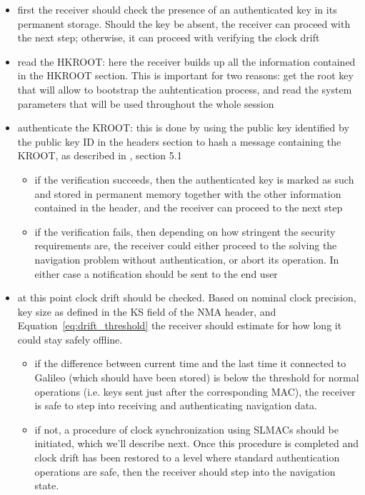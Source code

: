 \begin{itemize}
  \item first the receiver should check the presence of an authenticated key in
    its permanent storage. Should the key be absent, the receiver can proceed
    with the next step; otherwise, it can proceed with verifying the clock drift
  \item read the HKROOT: here the receiver builds up all the information contained
    in the HKROOT section. This is important for two reasons: get the root key
    that will allow to bootstrap the auhtentication process, and read the system
    parameters that will be used throughout the whole session
  \item authenticate the KROOT: this is done by using the public key identified
    by the public key ID in the headers section to hash a message containing the
    KROOT, as described in \cite{osnma}, section 5.1
    \begin{itemize}
      \item if the verification succeeds, then the authenticated key is marked
        as such and stored in permanent memory together with the other
        information contained in the header, and the receiver can proceed to
        the next step
      \item if the verification fails, then depending on how stringent the
        security requirements are, the receiver could either proceed to the
        solving the navigation problem without authentication, or abort its
        operation. In either case a notification should be sent to the end user
    \end{itemize}
  \item at this point clock drift should be checked. Based on nominal clock
    precision, key size as defined in the \textrm{KS} field of the NMA header,
    and Equation~\ref{eq:drift_threshold} the receiver should estimate for how
    long it could stay safely offline. 
    \begin{itemize}
      \item if the difference between current time and the last time it
        connected to Galileo (which should have been stored) is below the
        threshold for normal operations (i.e. keys sent just after the
        corresponding MAC), the receiver is safe to step into receiving and
        authenticating navigation data.
      \item if not, a procedure of clock synchronization using SLMACs should be
        initiated, which we'll describe next. Once this procedure is completed
        and clock drift has been restored to a level where standard
        authentication operations are safe, then the receiver should step into
        the navigation state.
    \end{itemize}
\end{itemize}

